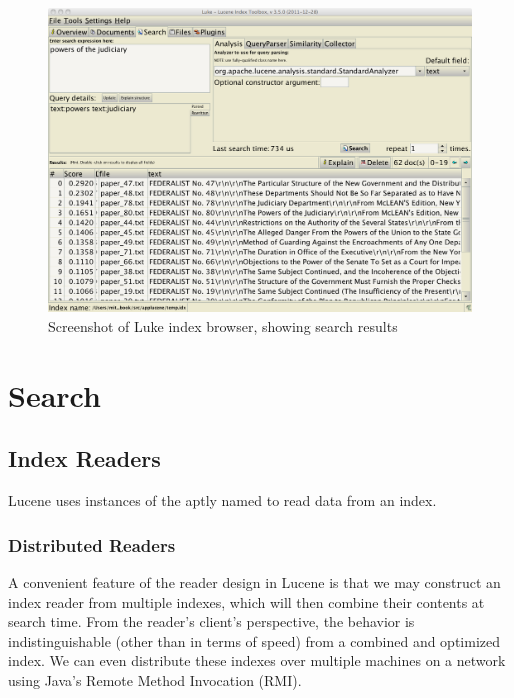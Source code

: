 \begin{figure}[!hbt]
\includegraphics[width=5.1in]{pngs/luke2.png}
\vspace*{-18pt}
\caption{Screenshot of Luke index browser, showing search results}\label{fig:luke-search}
\end{figure}

\section{Search}

\subsection{Index Readers}

Lucene uses instances of the aptly named  to
read data from an index.

\subsubsection{Distributed Readers}

A convenient feature of the reader design in Lucene is that we may
construct an index reader from multiple indexes, which will then
combine their contents at search time.  From the reader's client's
perspective, the behavior is indistinguishable (other than in terms of
speed) from a combined and optimized index.  We can even distribute
these indexes over multiple machines on a network using Java's Remote
Method Invocation (RMI).


